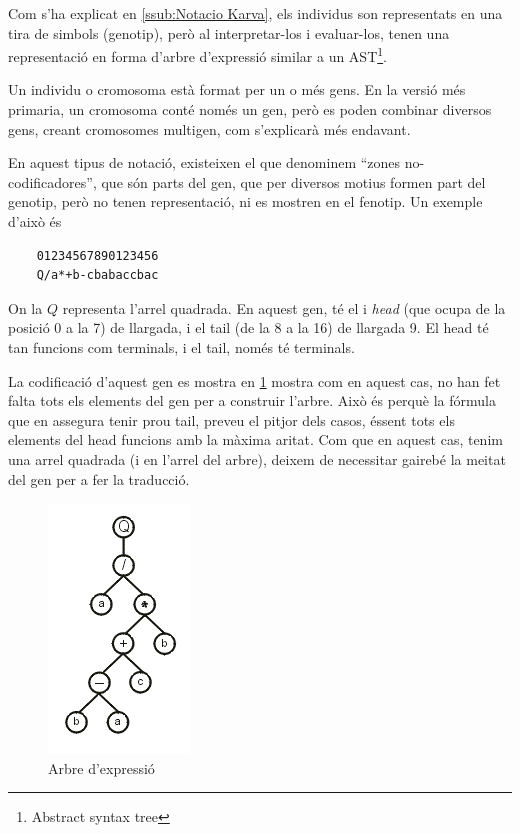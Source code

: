 Com s'ha explicat en \ref{ssub:Notacio Karva}, els individus son representats en
una tira de simbols (genotip), però al interpretar-los i evaluar-los, tenen una
representació en forma d'arbre d'expressió similar a un AST\footnote{Abstract
syntax tree}.

Un individu o cromosoma està format per un o més gens.  En la versió més
primaria, un cromosoma conté només un gen, però es poden combinar diversos gens,
creant cromosomes multigen, com s'explicarà més endavant.

En aquest tipus de notació, existeixen el que denominem ``zones
no-codificadores'', que són parts del gen, que per diversos motius formen part
del genotip, però no tenen representació, ni es mostren en el fenotip.  Un
exemple d'això és


\begin{verbatim}
	01234567890123456 	 
	Q/a*+b-cbabaccbac
\end{verbatim}

On la $Q$ representa l'arrel quadrada.  En aquest gen, té el i \emph{head} (que ocupa
de la posició 0 a la 7) de llargada, i el tail (de la 8 a la 16) de llargada 9.
El head té tan funcions com terminals, i el tail, només té terminals.

La codificació d'aquest gen es mostra en \ref{fig:unfinished} mostra com en aquest cas,
no han fet falta tots els elements del gen per a construir l'arbre.  Això és
perquè la fórmula que en assegura tenir prou tail, preveu el pitjor dels casos,
éssent tots els elements del head funcions amb la màxima aritat.  Com que en
aquest cas, tenim una arrel quadrada (i en l'arrel del arbre), deixem de
necessitar gairebé la meitat del gen per a fer la traducció.

\begin{figure}[h]
\begin{center}
\includegraphics{geptut/pt02.png}
\end{center}
\caption{Arbre d'expressió}
\label{fig:unfinished}
\end{figure}

